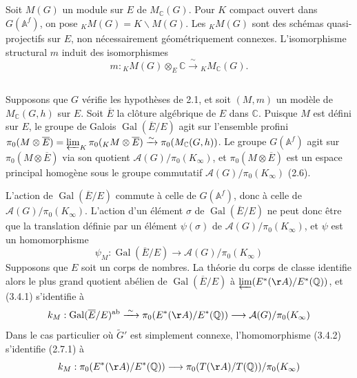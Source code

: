 \documentclass[11pt]{amsart}
\theoremstyle{plain}
\theoremstyle{definition}
\DeclareMathOperator{\Gal}{Gal}
\newcommand{\QQ}{\mathbb{Q}}
\newcommand{\CC}{\mathbb{C}}
\newcommand{\AAf}{\mathbb{A}^f}
\newcommand{\MC}{M_{\mathbb{C}}}
\begin{document}
\subsection{}

Soit $M(G)$ un module sur $E$ de $\MC(G)$. Pour $K$ compact ouvert dans $G(\AAf)$, on pose ${}_K M(G) = K \backslash M(G)$. Les ${}_K M(G)$ sont des sch\'emas quasi-projectifs sur $E$, non n\'ecessairement g\'eom\'etriquement connexes. L'isomorphisme structural $m$ induit des isomorphismes
\begin{equation}\label{eq:3.3.1}
m : {}_K M(G) \otimes_E \CC \xrightarrow{\;\sim\;} {}_K \MC(G).
\end{equation}

\subsection{}

Supposons que $G$ v\'erifie les hypoth\`eses de 2.1, et soit $(M,m)$ un mod\`ele de $\MC(G,h)$ sur $E$. Soit $\overline{E}$ la cl\^oture alg\'ebrique de $E$ dans $\CC$. Puisque $M$ est d\'efini sur $E$, le groupe de Galois $\Gal(\overline{E}/E)$ agit sur l'ensemble profini $\pi_0(M \otimes \overline{E}) = \varprojlim_K \pi_0({}_K M \otimes \overline{E}) \xrightarrow{\sim} \pi_0(\MC(G,h))$. Le groupe $G(\AAf)$ agit sur $\pi_0(M \otimes \overline{E})$ via son quotient $\mathcal{A}(G)/\pi_0(K_\infty)$, et $\pi_0(M \otimes \overline{E})$ est un espace principal homog\`ene sous le groupe commutatif $\mathcal{A}(G)/\pi_0(K_\infty)$ (2.6).

L'action de $\Gal(\overline{E}/E)$ commute \`a celle de $G(\AAf)$, donc \`a celle de $\mathcal{A}(G)/\pi_0(K_\infty)$. L'action d'un \'el\'ement $\sigma$ de $\Gal(\overline{E}/E)$ ne peut donc \^etre que la translation d\'efinie par un \'el\'ement $\psi(\sigma)$ de $\mathcal{A}(G)/\pi_0(K_\infty)$, et $\psi$ est un homomorphisme
\begin{equation}\label{eq:3.4.1}
\psi_M : \Gal(\overline{E}/E) \longrightarrow \mathcal{A}(G)/\pi_0(K_\infty)
\end{equation}
Supposons que $E$ soit un corps de nombres. La th\'eorie du corps de classe identifie alors le plus grand quotient ab\'elien de $\Gal(\overline{E}/E)$ \`a $\varprojlim (E^*(\AA)/E^*(\QQ))$, et (3.4.1) s'identifie \`a
\begin{equation}\label{eq:3.4.2}
k_M : \Gal(\overline{E}/E)^{\text{ab}} \xrightarrow{\;\sim\;} \pi_0(E^*(\AA)/E^*(\QQ)) \longrightarrow \mathcal{A}(G)/\pi_0(K_\infty)
\end{equation}
Dans le cas particulier o\`u $\tilde{G}'$ est simplement connexe, l'homomorphisme (3.4.2) s'identifie (2.7.1) \`a
\begin{equation}\label{eq:3.4.3}
k_M : \pi_0(E^*(\AA)/E^*(\QQ)) \longrightarrow \pi_0(T(\AA)/T(\QQ))/\pi_0(K_\infty)
\end{equation}
\end{document}
